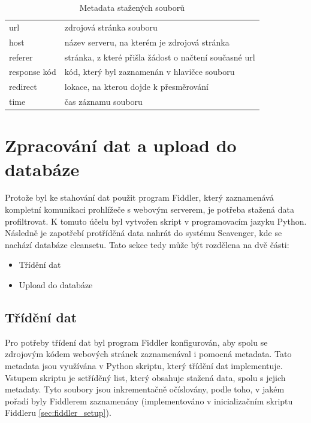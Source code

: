 \documentclass[thesis=M,czech,hidelinks]{FITthesis}[2013/05/06]
\begin{document}
\begin{table}[h]
	
	\centering
	\begin{tabular}{ll}
		url         	&  zdrojová stránka souboru \\
		host        	&  název serveru, na kterém je zdrojová stránka \\
		referer       	&  stránka, z které přišla žádost o načtení současné url \\
		response kód   	&  kód, který byl zaznamenán v hlavičce souboru  \\
		redirect		&  lokace, na kterou dojde k přesměrování \\
		time			&  čas záznamu souboru
	\end{tabular}
	
	\caption{Metadata stažených souborů}
	\label{fig:meta}
\end{table}



\section{Zpracování dat a upload do databáze}
Protože byl ke stahování dat použit program Fiddler, který zaznamenává kompletní komunikaci prohlížeče s webovým serverem, je potřeba stažená data profiltrovat. K tomuto účelu byl vytvořen skript v programovacím jazyku Python. Následně je zapotřebí protříděná data nahrát do systému Scavenger, kde se nachází databáze cleansetu. Tato sekce tedy může být rozdělena na dvě části:
\begin{itemize}
	\item Třídění dat
	\item Upload do databáze
\end{itemize}



\subsection{Třídění dat}\label{sec:trideni}
Pro potřeby třídení dat byl program Fiddler konfigurován, aby spolu se zdrojovým kódem webových stránek zaznamenával i pomocná metadata. Tato metadata jsou využívána v Python skriptu, který třídění dat implementuje. Vstupem skriptu je setříděný list, který obsahuje stažená data, spolu s jejich metadaty. Tyto soubory jsou inkrementačně očíslovány, podle toho, v jakém pořadí byly Fiddlerem zaznamenány (implementováno v inicializačním skriptu Fiddleru \ref{sec:fiddler_setup}).
\end{document}
